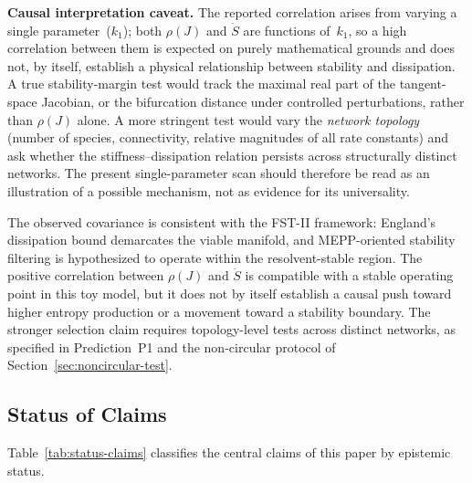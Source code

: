 \documentclass[12pt,a4paper]{article}
\theoremstyle{remark}
\begin{document}
\textbf{Causal interpretation caveat.} The reported correlation arises from varying a single parameter~($k_1$); both $\rho(J)$ and $\dot{S}$ are functions of~$k_1$, so a high correlation between them is expected on purely mathematical grounds and does not, by itself, establish a physical relationship between stability and dissipation. A true stability-margin test would track the maximal real part of the tangent-space Jacobian, or the bifurcation distance under controlled perturbations, rather than $\rho(J)$ alone. A more stringent test would vary the \emph{network topology} (number of species, connectivity, relative magnitudes of all rate constants) and ask whether the stiffness--dissipation relation persists across structurally distinct networks. The present single-parameter scan should therefore be read as an illustration of a possible mechanism, not as evidence for its universality.

The observed covariance is consistent with the FST-II framework: England's dissipation bound demarcates the viable manifold, and MEPP-oriented stability filtering is hypothesized to operate within the resolvent-stable region. The positive correlation between $\rho(J)$ and $\dot{S}$ is compatible with a stable operating point in this toy model, but it does not by itself establish a causal push toward higher entropy production or a movement toward a stability boundary. The stronger selection claim requires topology-level tests across distinct networks, as specified in Prediction~P1 and the non-circular protocol of Section~\ref{sec:noncircular-test}.

\subsection{Status of Claims}

Table~\ref{tab:status-claims} classifies the central claims of this paper by epistemic status.
\end{document}
